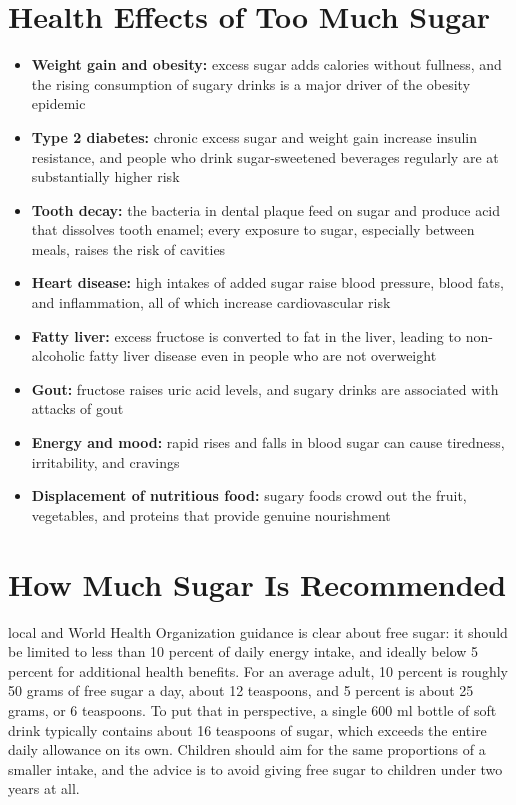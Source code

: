 \section*{Health Effects of Too Much Sugar}
\begin{itemize}
    \item \textbf{Weight gain and obesity:} excess sugar adds calories without fullness, and the rising consumption of sugary drinks is a major driver of the obesity epidemic
    \item \textbf{Type 2 diabetes:} chronic excess sugar and weight gain increase insulin resistance, and people who drink sugar-sweetened beverages regularly are at substantially higher risk
    \item \textbf{Tooth decay:} the bacteria in dental plaque feed on sugar and produce acid that dissolves tooth enamel; every exposure to sugar, especially between meals, raises the risk of cavities
    \item \textbf{Heart disease:} high intakes of added sugar raise blood pressure, blood fats, and inflammation, all of which increase cardiovascular risk
    \item \textbf{Fatty liver:} excess fructose is converted to fat in the liver, leading to non-alcoholic fatty liver disease even in people who are not overweight
    \item \textbf{Gout:} fructose raises uric acid levels, and sugary drinks are associated with attacks of gout
    \item \textbf{Energy and mood:} rapid rises and falls in blood sugar can cause tiredness, irritability, and cravings
    \item \textbf{Displacement of nutritious food:} sugary foods crowd out the fruit, vegetables, and proteins that provide genuine nourishment
\end{itemize}

\section*{How Much Sugar Is Recommended}
local and World Health Organization guidance is clear about free sugar: it should be limited to less than 10 percent of daily energy intake, and ideally below 5 percent for additional health benefits. For an average adult, 10 percent is roughly 50 grams of free sugar a day, about 12 teaspoons, and 5 percent is about 25 grams, or 6 teaspoons. To put that in perspective, a single 600 ml bottle of soft drink typically contains about 16 teaspoons of sugar, which exceeds the entire daily allowance on its own. Children should aim for the same proportions of a smaller intake, and the advice is to avoid giving free sugar to children under two years at all.

